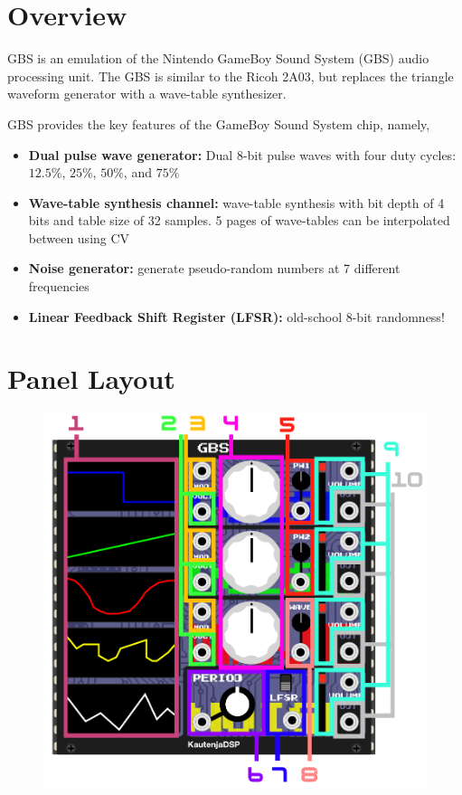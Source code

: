 \documentclass[12pt,a4paper]{article}
\begin{document}

\section{Overview}

GBS is an emulation of the Nintendo GameBoy Sound System (GBS) audio processing unit. The GBS is similar to the Ricoh 2A03, but replaces the triangle waveform generator with a wave-table synthesizer.

GBS provides the key features of the GameBoy Sound System chip, namely,
\begin{itemize}
  \item \textbf{Dual pulse wave generator:} Dual 8-bit pulse waves with four duty cycles: $12.5\%$, $25\%$, $50\%$, and $75\%$
  \item \textbf{Wave-table synthesis channel:} wave-table synthesis with bit depth of 4 bits and table size of 32 samples. 5 pages of wave-tables can be interpolated between using CV
  \item \textbf{Noise generator:} generate pseudo-random numbers at 7 different frequencies
  \item \textbf{Linear Feedback Shift Register (LFSR):} old-school 8-bit randomness!
\end{itemize}


\clearpage
\section{Panel Layout}
\begin{figure}[!htp]
\centering
\includegraphics{GBS-Manual}
\end{figure}
\end{document}
